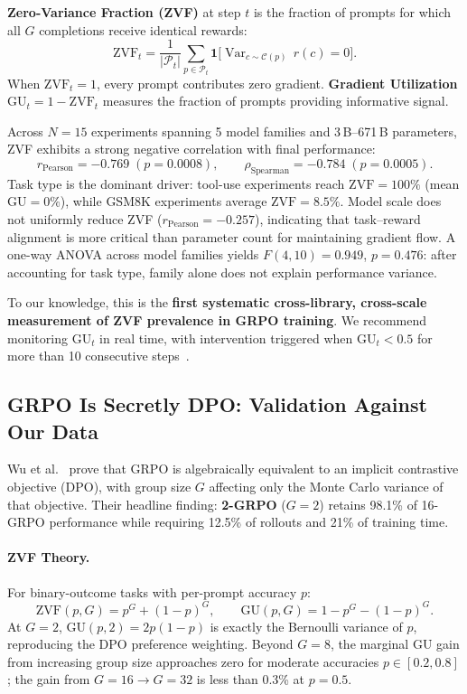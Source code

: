 \documentclass{article}
\begin{document}
\textbf{Zero-Variance Fraction (ZVF)} at step $t$ is the fraction of prompts
for which all $G$ completions receive identical rewards:
\[
  \mathrm{ZVF}_t = \frac{1}{|\mathcal{P}_t|}\sum_{p \in \mathcal{P}_t}
  \mathbf{1}\bigl[\operatorname{Var}_{c \sim \mathcal{C}(p)}\,r(c) = 0\bigr].
\]
When $\mathrm{ZVF}_t = 1$, every prompt contributes zero gradient.
\textbf{Gradient Utilization} $\mathrm{GU}_t = 1 - \mathrm{ZVF}_t$ measures
the fraction of prompts providing informative signal.

Across $N = 15$ experiments spanning 5 model families and 3\,B--671\,B parameters,
ZVF exhibits a strong negative correlation with final performance:
\[
  r_{\text{Pearson}} = -0.769 \;(p = 0.0008), \qquad
  \rho_{\text{Spearman}} = -0.784 \;(p = 0.0005).
\]
Task type is the dominant driver: tool-use experiments reach $\mathrm{ZVF} = 100\%$
(mean $\mathrm{GU} = 0\%$), while GSM8K experiments average $\mathrm{ZVF} = 8.5\%$.
Model scale does not uniformly reduce ZVF
($r_\text{Pearson} = -0.257$), indicating that task--reward alignment is more
critical than parameter count for maintaining gradient flow. A one-way ANOVA
across model families yields $F(4,10) = 0.949$, $p = 0.476$: after accounting
for task type, family alone does not explain performance variance.

To our knowledge, this is the \textbf{first systematic cross-library, cross-scale
measurement of ZVF prevalence in GRPO training}. We recommend monitoring
$\mathrm{GU}_t$ in real time, with intervention triggered when $\mathrm{GU}_t < 0.5$
for more than 10 consecutive steps~\cite{zhang2026aero,zhang2026greso}.

\subsection{GRPO Is Secretly DPO: Validation Against Our Data}
\label{sec:grpo-dpo}

Wu et al.~\cite{wu2025grpo_dpo} prove that GRPO is algebraically equivalent to
an implicit contrastive objective (DPO), with group size $G$ affecting only
the Monte Carlo variance of that objective. Their headline finding: \textbf{2-GRPO}
($G=2$) retains 98.1\% of 16-GRPO performance while requiring 12.5\% of rollouts
and 21\% of training time.

\paragraph{ZVF Theory.}
For binary-outcome tasks with per-prompt accuracy $p$:
\[
  \mathrm{ZVF}(p, G) = p^G + (1-p)^G, \qquad
  \mathrm{GU}(p, G) = 1 - p^G - (1-p)^G.
\]
At $G=2$, $\mathrm{GU}(p,2) = 2p(1-p)$ is exactly the Bernoulli variance of $p$,
reproducing the DPO preference weighting.
Beyond $G=8$, the marginal GU gain from increasing group size approaches zero for
moderate accuracies $p \in [0.2, 0.8]$; the gain from $G=16 \to G=32$ is less
than 0.3\% at $p=0.5$.
\end{document}
